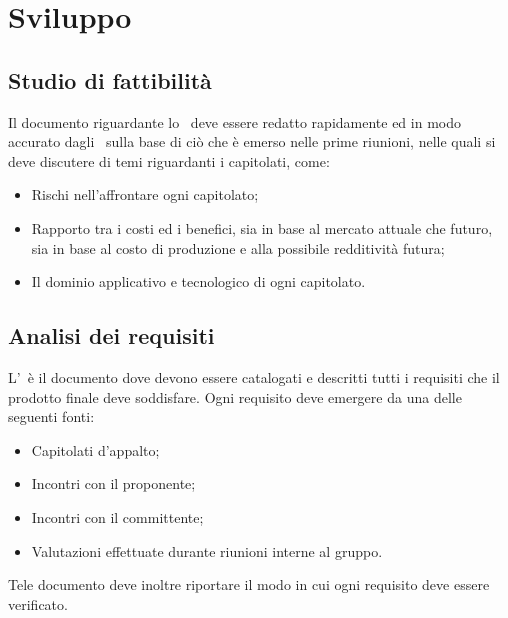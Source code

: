 \documentclass[../NormeProgetto.tex]{subfiles}
\begin{document}
\section{Sviluppo}
	\subsection{Studio di fattibilità}
	Il documento riguardante lo \studiodifattibilita\ deve essere redatto rapidamente ed in modo accurato dagli \analisti\ sulla base di ciò che è emerso nelle prime riunioni, nelle quali si deve discutere di temi riguardanti i capitolati, come:
	\begin{itemize}
		\item Rischi nell'affrontare ogni capitolato;
		\item Rapporto tra i costi ed i benefici, sia in base al mercato attuale che futuro, sia in base al costo di produzione e alla possibile redditività futura;
		\item Il dominio applicativo e tecnologico di ogni capitolato.
	\end{itemize}
	\subsection{Analisi dei requisiti}
	L'\analisideirequisiti\ è il documento dove devono essere catalogati e descritti tutti i requisiti che il prodotto finale deve soddisfare. Ogni requisito deve emergere da una delle seguenti fonti:
	\begin{itemize}
		\item Capitolati d'appalto;
		\item Incontri con il proponente;
		\item Incontri con il committente;
		\item Valutazioni effettuate durante riunioni interne al gruppo.
	\end{itemize}
	Tele documento deve inoltre riportare il modo in cui ogni requisito deve essere verificato.
\end{document}
